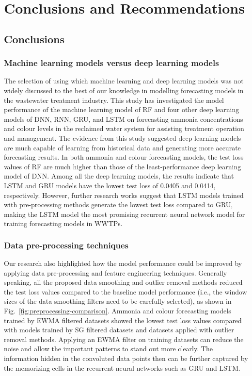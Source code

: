 \chapter{Conclusions and Recommendations}
\section{Conclusions}
\subsection{Machine learning models versus deep learning models}
The selection of using which machine learning and deep learning models was not widely discussed to the best of our knowledge in modelling forecasting models in the wastewater treatment industry. This study has investigated the model performance of the machine learning model of RF and four other deep learning models of DNN, RNN, GRU, and LSTM on forecasting ammonia concentrations and colour levels in the reclaimed water system for assisting treatment operation and management. The evidence from this study suggested deep learning models are much capable of learning from historical data and generating more accurate forecasting results. In both ammonia and colour forecasting models, the test loss values of RF are much higher than those of the least-performance deep learning model of DNN. Among all the deep learning models, the results indicate that LSTM and GRU models have the lowest test loss of 0.0405 and 0.0414, respectively. However, further research works suggest that LSTM models trained with pre-processing methods generate the lowest test loss compared to GRU, making the LSTM model the most promising recurrent neural network model for training forecasting models in WWTPs.

\subsection{Data pre-processing techniques}
Our research also highlighted how the model performance could be improved by applying data pre-processing and feature engineering techniques. Generally speaking, all the proposed data smoothing and outlier removal methods reduced the test loss values compared to the baseline model performance (i.e., the window sizes of the data smoothing filters need to be carefully selected), as shown in Fig.~\ref{fig:preprocessing-comparison}. Ammonia and colour forecasting models trained by EWMA filtered datasets showed the lowest test loss values compared with models trained by SG filtered datasets and datasets applied with outlier removal methods. Applying an EWMA filter on training datasets can reduce the noise and allow the important patterns to stand out more clearly. The information hidden in the convoluted data points then can be further captured by the memorizing cells in the recurrent neural networks such as GRU and LSTM.

